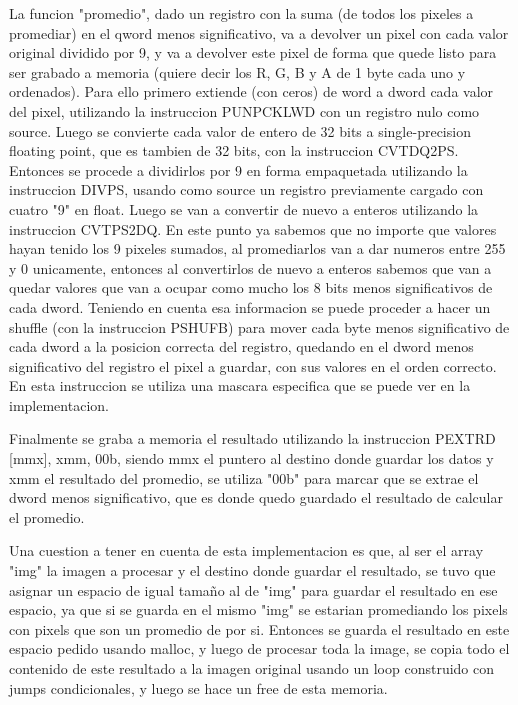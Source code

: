 \documentclass[a4paper]{article}
\begin{document}
La funcion "promedio", dado un registro con la suma (de todos los pixeles a promediar) en el qword menos significativo, va a devolver un pixel con cada valor original dividido por 9, y va a devolver este pixel de forma que quede listo para ser grabado a memoria (quiere decir los R, G, B y A de 1 byte cada uno y ordenados). Para ello primero extiende (con ceros) de word a dword cada valor del pixel, utilizando la instruccion PUNPCKLWD con un registro nulo como source. Luego se convierte cada valor de entero de 32 bits a single-precision floating point, que es tambien de 32 bits, con la instruccion CVTDQ2PS. Entonces se procede a dividirlos por 9 en forma empaquetada utilizando la instruccion DIVPS, usando como source un registro previamente cargado con cuatro "9" en float. Luego se van a convertir de nuevo a enteros utilizando la instruccion CVTPS2DQ. En este punto ya sabemos que no importe que valores hayan tenido los 9 pixeles sumados, al promediarlos van a dar numeros entre 255 y 0 unicamente, entonces al convertirlos de nuevo a enteros sabemos que van a quedar valores que van a ocupar como mucho los 8 bits menos significativos de cada dword. Teniendo en cuenta esa informacion se puede proceder a hacer un shuffle (con la instruccion PSHUFB) para mover cada byte menos significativo de cada dword a la posicion correcta del registro, quedando en el dword menos significativo del registro el pixel a guardar, con sus valores en el orden correcto. En esta instruccion se utiliza una mascara especifica que se puede ver en la implementacion.
\newline

Finalmente se graba a memoria el resultado utilizando la instruccion PEXTRD [mmx], xmm, 00b, siendo mmx el puntero al destino donde guardar los datos y xmm el resultado del promedio, se utiliza "00b" para marcar que se extrae el dword menos significativo, que es donde quedo guardado el resultado de calcular el promedio.
\newline

Una cuestion a tener en cuenta de esta implementacion es que, al ser el array "img" la imagen a procesar y el destino donde guardar el resultado, se tuvo que asignar un espacio de igual tamaño al de "img" para guardar el resultado en ese espacio, ya que si se guarda en el mismo "img" se estarian promediando los pixels con pixels que son un promedio de por si. Entonces se guarda el resultado en este espacio pedido usando malloc, y luego de procesar toda la image, se copia todo el contenido de este resultado a la imagen original usando un loop construido con jumps condicionales, y luego se hace un free de esta memoria.
\end{document}

